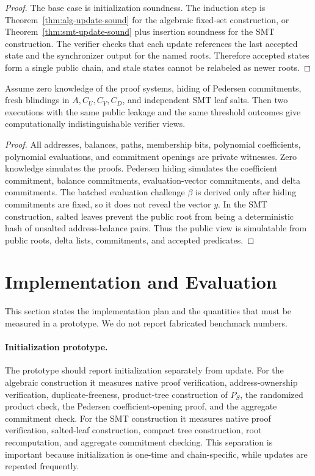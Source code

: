 \documentclass[runningheads]{llncs}
\begin{document}
\begin{proof}
The base case is initialization soundness.  The induction step is Theorem~\ref{thm:alg-update-sound} for the algebraic fixed-set construction, or Theorem~\ref{thm:smt-update-sound} plus insertion soundness for the SMT construction.  The verifier checks that each update references the last accepted state and the synchronizer output for the named roots.  Therefore accepted states form a single public chain, and stale states cannot be relabeled as newer roots.
\end{proof}

\begin{theorem}[Privacy]
Assume zero knowledge of the proof systems, hiding of Pedersen commitments, fresh blindings in \(A,C_U,C_Y,C_D\), and independent SMT leaf salts.  Then two executions with the same public leakage and the same threshold outcomes give computationally indistinguishable verifier views.
\end{theorem}

\begin{proof}
All addresses, balances, paths, membership bits, polynomial coefficients, polynomial evaluations, and commitment openings are private witnesses.  Zero knowledge simulates the proofs.  Pedersen hiding simulates the coefficient commitment, balance commitments, evaluation-vector commitments, and delta commitments.  The batched evaluation challenge \(\beta\) is derived only after hiding commitments are fixed, so it does not reveal the vector \(y\).  In the SMT construction, salted leaves prevent the public root from being a deterministic hash of unsalted address-balance pairs.  Thus the public view is simulatable from public roots, delta lists, commitments, and accepted predicates.
\end{proof}

\section{Implementation and Evaluation}

This section states the implementation plan and the quantities that must be measured in a prototype.  We do not report fabricated benchmark numbers.

\paragraph{Initialization prototype.}
The prototype should report initialization separately from update.  For the algebraic construction it measures native proof verification, address-ownership verification, duplicate-freeness, product-tree construction of \(P_S\), the randomized product check, the Pedersen coefficient-opening proof, and the aggregate commitment check.  For the SMT construction it measures native proof verification, salted-leaf construction, compact tree construction, root recomputation, and aggregate commitment checking.  This separation is important because initialization is one-time and chain-specific, while updates are repeated frequently.
\end{document}
